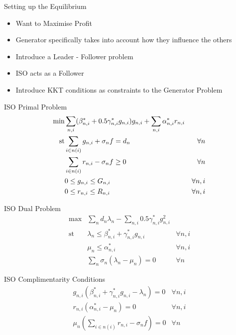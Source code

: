 \documentclass[xcolor=x11names,compress]{beamer}
\renewcommand{\(}{\begin{columns}}
\renewcommand{\)}{\end{columns}}
\newcommand{\<}[1]{\begin{column}{#1}}
\renewcommand{\>}{\end{column}}
\begin{document}
\begin{frame}{Setting up the Equilibrium}
\begin{itemize}
\item Want to Maximise Profit
\item Generator specifically takes into account how they influence the others
\item Introduce a Leader - Follower problem
\item ISO acts as a Follower
\item Introduce KKT conditions as constraints to the Generator Problem
\end{itemize}
\end{frame}

\begin{frame}{ISO Primal Problem}
\begin{eqnarray*}
\min & \sum_{n,i} (\beta^{*}_{n,i} + 0.5\gamma^{*}_{n,i}g_{n,i})g_{n,i} + \sum_{n,i} \alpha^{*}_{n,i}r_{n,i} & \\
\text{st} & \sum_{i \in n(i)} g_{n,i} + \sigma_{n}f = d_{n} \hspace{0.2cm} & \forall n \\
& \sum_{i \in n(i)} r_{n,i} -\sigma_{n}f \ge 0 \hspace{0.2cm} & \forall n \\
& 0 \le g_{n,i} \le G_{n,i} & \forall n, i \\
& 0 \le r_{n,i} \le R_{n,i} & \forall n, i
\end{eqnarray*}
\end{frame}

\begin{frame}{ISO Dual Problem}
\begin{eqnarray*}
\max &\sum_{n} d_{n}\lambda_{n} - \sum_{n,i} 0.5\gamma^{*}_{n,i}g_{n,i}^{2} & \\
\mathrm{st} & \lambda_{n} \le \beta^{*}_{n,i} + \gamma^{*}_{n,i}g_{n,i} & \forall n, i \\
& \mu_{n} \le \alpha^{*}_{n,i} & \forall n, i \\
& \sum_{n} \sigma_{n}(\lambda_{n} - \mu_{n}) = 0 & \forall n
\end{eqnarray*}
\end{frame}

\begin{frame}{ISO Complimentarity Conditions}
\begin{eqnarray*}
g_{n,i}(\beta^{*}_{n,i} + \gamma^{*}_{n,i}g_{n,i} - \lambda_{n}) = 0 & \forall n,i \\
r_{n,i}(\alpha^{*}_{n,i} - \mu_{n}) = 0 & \forall n, i \\
\mu_{n}(\sum_{i \in n(i)} r_{n,i} - \sigma_{n}f) = 0 & \forall n
\end{eqnarray*}
\end{frame}
\end{document}
